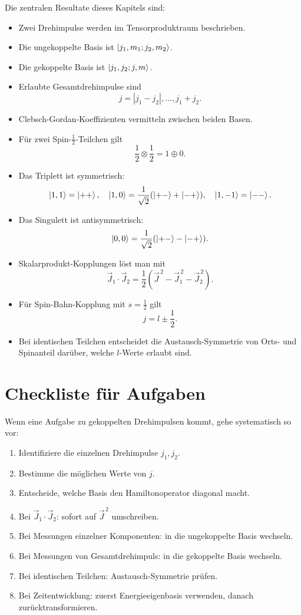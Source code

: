 \begin{answerbox}
Die zentralen Resultate dieses Kapitels sind:
\begin{itemize}
    \item Zwei Drehimpulse werden im Tensorproduktraum beschrieben.
    \item Die ungekoppelte Basis ist \(\left|j_1,m_1;j_2,m_2\right\rangle\).
    \item Die gekoppelte Basis ist \(\left|j_1,j_2;j,m\right\rangle\).
    \item Erlaubte Gesamtdrehimpulse sind
    \[
        j=|j_1-j_2|,\dots,j_1+j_2.
    \]
    \item Clebsch-Gordan-Koeffizienten vermitteln zwischen beiden Basen.
    \item Für zwei Spin-\(\frac12\)-Teilchen gilt
    \[
        \frac12\otimes\frac12=1\oplus0.
    \]
    \item Das Triplett ist symmetrisch:
    \[
        \left|1,1\right\rangle=\left|++\right\rangle,
        \quad
        \left|1,0\right\rangle=\frac{1}{\sqrt2}(\left|+-\right\rangle+\left|-+\right\rangle),
        \quad
        \left|1,-1\right\rangle=\left|--\right\rangle.
    \]
    \item Das Singulett ist antisymmetrisch:
    \[
        \left|0,0\right\rangle=\frac{1}{\sqrt2}(\left|+-\right\rangle-\left|-+\right\rangle).
    \]
    \item Skalarprodukt-Kopplungen löst man mit
    \[
        \vec J_1\cdot\vec J_2
        =\frac12(\vec J^{\,2}-\vec J_1^{\,2}-\vec J_2^{\,2}).
    \]
    \item Für Spin-Bahn-Kopplung mit \(s=\frac12\) gilt
    \[
        j=l\pm\frac12.
    \]
    \item Bei identischen Teilchen entscheidet die Austausch-Symmetrie von Orts- und Spinanteil darüber, welche \(l\)-Werte erlaubt sind.
\end{itemize}
\end{answerbox}

\section{Checkliste für Aufgaben}

\begin{examtipbox}
Wenn eine Aufgabe zu gekoppelten Drehimpulsen kommt, gehe systematisch so vor:
\begin{enumerate}
    \item Identifiziere die einzelnen Drehimpulse \(j_1,j_2\).
    \item Bestimme die möglichen Werte von \(j\).
    \item Entscheide, welche Basis den Hamiltonoperator diagonal macht.
    \item Bei \(\vec J_1\cdot\vec J_2\): sofort auf \(\vec J^{\,2}\) umschreiben.
    \item Bei Messungen einzelner Komponenten: in die ungekoppelte Basis wechseln.
    \item Bei Messungen von Gesamtdrehimpuls: in die gekoppelte Basis wechseln.
    \item Bei identischen Teilchen: Austausch-Symmetrie prüfen.
    \item Bei Zeitentwicklung: zuerst Energieeigenbasis verwenden, danach zurücktransformieren.
\end{enumerate}
\end{examtipbox}
